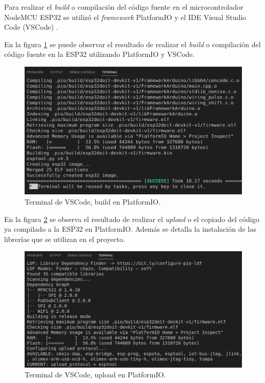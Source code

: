Para realizar el \textit{build} o compilación del código fuente en el microcontrolador NodeMCU ESP32 se utilizó el \textit{framework} PlatformIO \cite{platformio} y el IDE Visual Studio Code (VSCode) \cite{vscode}.

En la figura \ref{fig:platformio-build} se puede observar el resultado de realizar el \textit{build}  o compilación del código fuente en la ESP32 utilizando PlatformIO y VSCode.

\begin{figure}[H]
	\centering
	\includegraphics[width=\textwidth]{./Figures/platformio-build.png}
	\caption{Terminal de VSCode, build en PlatformIO.}
	\label{fig:platformio-build}
\end{figure}

En la figura \ref{fig:platformio-upload} se observa el resultado de realizar el \textit{upload} o el copiado del código ya compilado a la ESP32 en PlatformIO. Además se detalla la instalación de las librerías que se utilizan en el proyecto.

\begin{figure}[H]
	\centering
	\includegraphics[width=\textwidth]{./Figures/platformio-upload.png}
	\caption{Terminal de VSCode, upload en PlatformIO.}
	\label{fig:platformio-upload}
\end{figure}

